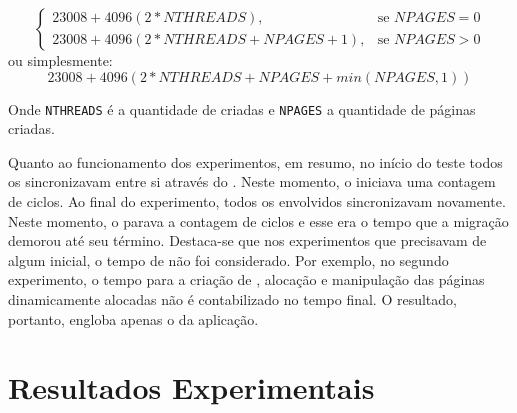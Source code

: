 \[
\begin{cases}
    23008 + 4096(2*NTHREADS),& \text{se } NPAGES= 0\\
    23008 + 4096(2*NTHREADS + NPAGES + 1),& \text{se } NPAGES > 0
\end{cases}
\]
ou simplesmente:
\begin{equation}\label{eq.3}
    23008 + 4096(2*NTHREADS + NPAGES + min(NPAGES, 1))
\end{equation}

Onde \texttt{NTHREADS} é a quantidade de \threads criadas e \texttt{NPAGES} a quantidade de páginas criadas.


Quanto ao funcionamento dos experimentos, em resumo, no início do teste todos os \clusters sincronizavam entre si através do \sync. Neste momento, o \iocluster iniciava uma contagem de ciclos. Ao final do experimento, todos os \clusters envolvidos sincronizavam novamente. Neste momento, o \iocluster parava a contagem de ciclos e esse era o tempo que a migração demorou até seu término. Destaca-se que nos experimentos que precisavam de algum \setup inicial, o tempo de \setup não foi considerado. Por exemplo, no segundo experimento, o tempo para a criação de \threads, alocação e manipulação das páginas dinamicamente alocadas não é contabilizado no tempo final. O resultado, portanto, engloba apenas o \downtime da aplicação.



\chapter{Resultados Experimentais}
\label{chap.results}

